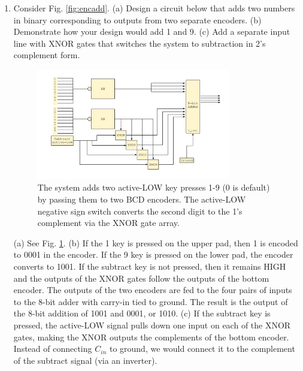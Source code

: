\documentclass[10pt]{article}
\begin{document}
\begin{enumerate}
\item Consider Fig. \ref{fig:encadd}.  (a) Design a circuit below that adds two numbers in binary corresponding to outputs from two separate encoders. (b) Demonstrate how your design would add 1 and 9.  (c) Add a separate input line with XNOR gates that switches the system to subtraction in 2's complement form. \\

\begin{figure}[ht]
\centering
\includegraphics[width=0.8\textwidth]{figures/design1.pdf}
\caption{\label{fig:design1} The system adds two active-LOW key presses 1-9 (0 is default) by passing them to two BCD encoders.  The active-LOW negative sign switch converts the second digit to the 1's complement via the XNOR gate array.}
\end{figure}

(a) See Fig. \ref{fig:design1}.  (b) If the 1 key is pressed on the upper pad, then 1 is encoded to 0001 in the encoder.  If the 9 key is pressed on the lower pad, the encoder converts to 1001.  If the subtract key is not pressed, then it remains HIGH and the outputs of the XNOR gates follow the outputs of the bottom encoder.  The outputs of the two encoders are fed to the four pairs of inputs to the 8-bit adder with carry-in tied to ground.  The result is the output of the 8-bit addition of 1001 and 0001, or 1010. (c) If the subtract key is pressed, the active-LOW signal pulls down one input on each of the XNOR gates, making the XNOR outputs the complements of the bottom encoder.  Instead of connecting $C_{in}$ to ground, we would connect it to the complement of the subtract signal (via an inverter).

\clearpage


\end{enumerate}
\end{document}
